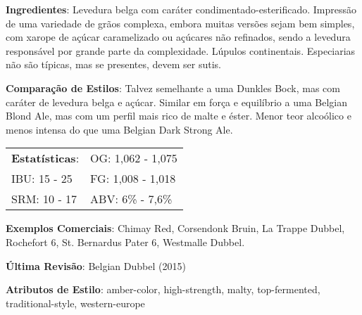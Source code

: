 \textbf{Ingredientes}: Levedura belga com caráter condimentado-esterificado. Impressão de uma variedade de grãos complexa, embora muitas versões sejam bem simples, com xarope de açúcar caramelizado ou açúcares não refinados, sendo a levedura responsável por grande parte da complexidade. Lúpulos continentais. Especiarias não são típicas, mas se presentes, devem ser sutis.

\textbf{Comparação de Estilos}: Talvez semelhante a uma Dunkles Bock, mas com caráter de levedura belga e açúcar. Similar em força e equilíbrio a uma Belgian Blond Ale, mas com um perfil mais rico de malte e éster. Menor teor alcoólico e menos intensa do que uma Belgian Dark Strong Ale.

\begin{tabular}{@{}p{35mm}p{35mm}@{}}
  \textbf{Estatísticas}: & OG: 1,062 - 1,075 \\
  IBU: 15 - 25  & FG: 1,008 - 1,018  \\
  SRM: 10 - 17  & ABV: 6\% - 7,6\%
\end{tabular}

\textbf{Exemplos Comerciais}: Chimay Red, Corsendonk Bruin, La Trappe Dubbel, Rochefort 6, St. Bernardus Pater 6, Westmalle Dubbel.

\textbf{Última Revisão}: Belgian Dubbel (2015)

\textbf{Atributos de Estilo}: amber-color, high-strength, malty, top-fermented, traditional-style, western-europe
